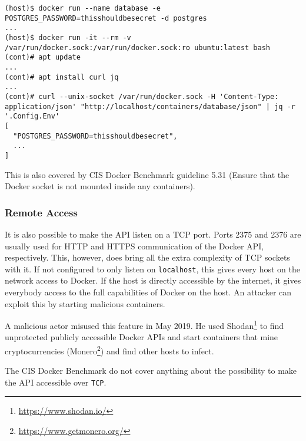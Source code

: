 \begin{lstlisting}[caption={Example extract secrets using the Docker API.},captionpos=b]
(host)$ docker run --name database -e POSTGRES_PASSWORD=thisshouldbesecret -d postgres
...
(host)$ docker run -it --rm -v /var/run/docker.sock:/var/run/docker.sock:ro ubuntu:latest bash
(cont)# apt update
...
(cont)# apt install curl jq
...
(cont)# curl --unix-socket /var/run/docker.sock -H 'Content-Type: application/json' "http://localhost/containers/database/json" | jq -r '.Config.Env'
[
  "POSTGRES_PASSWORD=thisshouldbesecret",
  ...
]
\end{lstlisting}

\medskip

This is also covered by CIS Docker Benchmark guideline 5.31 (Ensure that the Docker socket is not mounted inside any containers).

\subsubsection{Remote Access}\label{subsubsection:remote-access}
It is also possible to make the API listen on a TCP port. Ports 2375 and 2376 are usually used for HTTP and HTTPS communication of the Docker API, respectively. This, however, does bring all the extra complexity of TCP sockets with it. If not configured to only listen on \lstinline{localhost}, this gives every host on the network access to Docker. If the host is directly accessible by the internet, it gives everybody access to the full capabilities of Docker on the host. An attacker can exploit this by starting malicious containers\cite{Metasploit-Unprotected-TCP-Socket}.

\medskip

A malicious actor misused this feature in May 2019. He used Shodan\footnote{\url{https://www.shodan.io/}} to find unprotected publicly accessible Docker APIs and start containers that mine cryptocurrencies (Monero\footnote{\url{https://www.getmonero.org/}}) and find other hosts to infect\cite{zoolu2-bot-1807}\cite{zoolu2-bot-1809}\cite{zoolu2-bot-1853}.

The CIS Docker Benchmark do not cover anything about the possibility to make the API accessible over \lstinline{TCP}.
